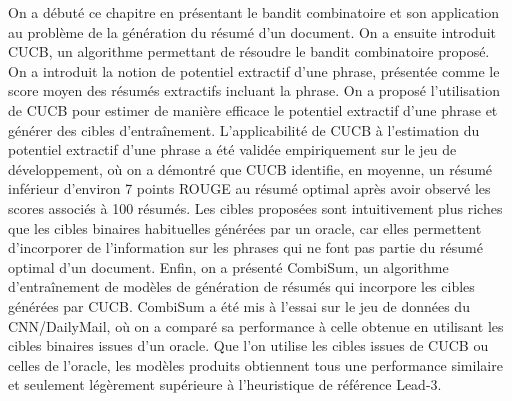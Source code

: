 
On a débuté ce chapitre en présentant le bandit combinatoire et son application 
au problème de la génération du résumé d'un document.
On a ensuite introduit CUCB, un algorithme permettant de résoudre le 
bandit combinatoire proposé.
On a introduit la notion de potentiel extractif d'une phrase,
présentée comme le score moyen des résumés extractifs incluant 
la phrase.
On a proposé l'utilisation de CUCB pour estimer de manière 
efficace le potentiel extractif d'une phrase et 
générer des cibles d'entraînement.
L'applicabilité de CUCB à l'estimation du potentiel extractif d'une 
phrase a été validée empiriquement sur le jeu de développement,
où on a démontré que CUCB identifie, en moyenne, un résumé 
inférieur d'environ 7 points ROUGE au résumé optimal après avoir 
observé les scores associés à 100 résumés.
Les cibles proposées sont intuitivement plus riches que les cibles 
binaires habituelles générées par un oracle, car elles permettent 
d'incorporer de l'information sur les phrases qui ne font pas partie 
du résumé optimal d'un document. 
Enfin, on a présenté CombiSum, un algorithme d'entraînement de modèles 
de génération de résumés qui incorpore les cibles générées par CUCB.
CombiSum a été mis à l'essai sur le jeu de données du CNN/DailyMail,
où on a comparé sa performance à celle obtenue en utilisant les cibles 
binaires issues d'un oracle.
Que l'on utilise les cibles issues de CUCB ou celles de l'oracle,
les modèles produits obtiennent tous une performance similaire et 
seulement légèrement supérieure à l'heuristique de référence Lead-3.


